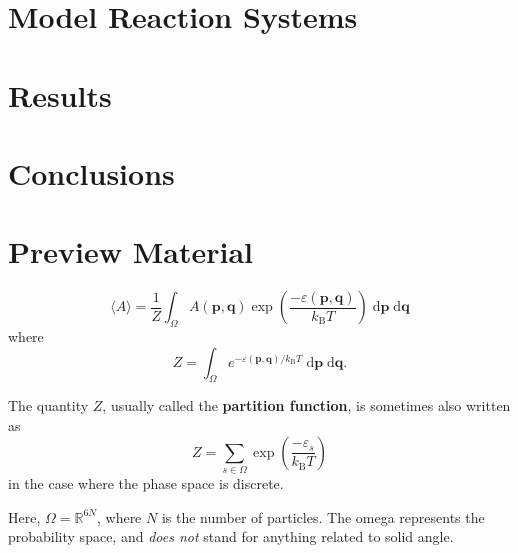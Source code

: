 \documentclass[english,letterpaper,12pt]{article}
\newcommand{\dee}{\;\mathrm{d}}
\renewcommand{\vec}[1]{\ensuremath{\mathbf{#1}}}
\newcommand{\kB}{\ensuremath{k_\mathrm{B}}}
\begin{document}
\begin{doublespacing}


\section{Model Reaction Systems} %
\label{sec:model-systems}

\section{Results} %
\label{sec:results}

\section{Conclusions} %
\label{sec:conclusions}


\end{doublespacing}

\appendix
\section{Preview Material} %
\label{sec:preview-material}


\lipsum[1-2]



\begin{equation}
    \langle A \rangle = \frac{1}{Z} \int_\Omega A(\vec{p}, \vec{q}) \exp\left(\frac{-\varepsilon(\vec{p}, \vec{q})}{\kB T}\right) \dee \vec{p} \dee \vec{q}
\end{equation}
where
\begin{equation}
    Z = \int_\Omega e^{-\varepsilon(\vec{p}, \vec{q}) / \kB T}\dee \vec{p} \dee \vec{q}.
\end{equation}

The quantity $Z$, usually called the \textbf{partition function}, is sometimes also written as
\begin{equation}
    Z = \sum_{s \in \Omega} \exp\left( \frac{-\varepsilon_s}{\kB T} \right)
    \label{eq:partfun-discrete}
\end{equation}
in the case where the phase space is discrete.

Here, $\Omega = \mathbb{R}^{6N}$, where $N$ is the number of particles. The omega represents the probability space, and \emph{does not} stand for anything related to solid angle.
\end{document}
